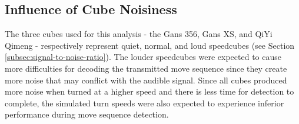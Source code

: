 \subsection{Influence of Cube Noisiness}
\label{subsec:influence-cube-noisiness}

The three cubes used for this analysis - the Gans 356, Gans XS, and
QiYi Qimeng - respectively represent quiet, normal, and loud speedcubes
(see Section \ref{subsec:signal-to-noise-ratio}). The louder speedcubes
were expected to cause more difficulties for decoding the transmitted
move sequence since they create more noise that may conflict with the
audible signal. Since all cubes produced more noise when turned at a
higher speed and there is less time for detection to complete, the
simulated turn speeds were also expected to experience inferior
performance during move sequence detection.

